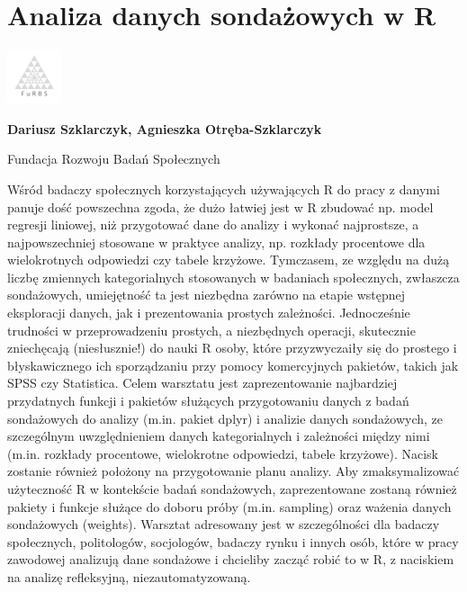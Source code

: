 \documentclass[\main/boa.tex]{subfiles}
\begin{document}
\section{Analiza danych sondażowych w R}
\begin{minipage}[t]{0.915\textwidth}
	\center     
    \includegraphics[width=60px]{img/workshops/czarno_biale/furbs.png} 
\end{minipage}

\begin{minipage}{0.915\textwidth}
\centering
{\bf {} Dariusz Szklarczyk,  Agnieszka Otręba-Szklarczyk}
\end{minipage}

\vskip 0.3cm

\begin{affiliations}
\begin{minipage}{0.915\textwidth}
\centering
\large Fundacja Rozwoju Badań Społecznych  \\[2pt]
\end{minipage}
\end{affiliations}

\vskip 0.8cm

\opiswarsztatu Wśród badaczy społecznych korzystających używających R do pracy z danymi panuje dość powszechna zgoda, że dużo łatwiej jest w R zbudować np. model regresji liniowej, niż przygotować dane do analizy i wykonać najprostsze, a najpowszechniej stosowane w praktyce analizy, np. rozkłady procentowe dla wielokrotnych odpowiedzi czy tabele krzyżowe. Tymczasem, ze względu na dużą liczbę zmiennych kategorialnych stosowanych w badaniach społecznych, zwłaszcza sondażowych, umiejętność ta jest niezbędna zarówno na etapie wstępnej eksploracji danych, jak i prezentowania prostych zależności. Jednocześnie trudności w przeprowadzeniu prostych, a niezbędnych operacji, skutecznie zniechęcają (niesłusznie!) do nauki R osoby, które przyzwyczaiły się do prostego i błyskawicznego ich sporządzaniu przy pomocy komercyjnych pakietów, takich jak SPSS czy Statistica. Celem warsztatu jest zaprezentowanie najbardziej przydatnych funkcji i pakietów służących przygotowaniu danych z badań sondażowych do analizy (m.in. pakiet dplyr) i analizie danych sondażowych, ze szczególnym uwzględnieniem danych kategorialnych i zależności między nimi (m.in. rozkłady procentowe, wielokrotne odpowiedzi, tabele krzyżowe). Nacisk zostanie również położony na przygotowanie planu analizy. Aby zmaksymalizować użyteczność R w kontekście badań sondażowych, zaprezentowane zostaną również pakiety i funkcje służące do doboru próby (m.in. sampling) oraz ważenia danych sondażowych (weights). Warsztat adresowany jest w szczególności dla badaczy społecznych, politologów, socjologów, badaczy rynku i innych osób, które w pracy zawodowej analizują dane sondażowe i chcieliby zacząć robić to w R, z naciskiem na analizę refleksyjną, niezautomatyzowaną.
\end{document}

